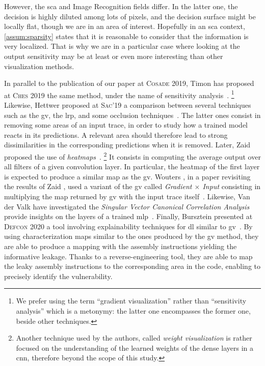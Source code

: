 However, the \gls{sca} and Image Recognition fields differ.
In the latter one, the decision is highly diluted among lots of pixels, and the decision surface might be locally flat, though we are in an area of interest.
Hopefully in an \gls{sca} context, \autoref{assum:sparsity} states that it is reasonable to consider that the information is very localized.  
That is why we are in a particular case where looking at the output sensitivity may be at least or even more interesting than other visualization methods.

In parallel to the publication of our paper at \textsc{Cosade} 2019, Timon has proposed at \textsc{Ches} 2019 the same method, under the name of sensitivity analysis~\cite{timon_non-profiled_2019}.%
\footnote{
	We prefer using the term ``gradient visualization'' rather than ``sensitivity analysis'' which is a metonymy: the latter one encompasses the former one, beside other techniques.
}
Likewise, Hettwer proposed at \textsc{Sac}'19 a comparison between several techniques such as the \gls{gv}, the \gls{lrp}, and some occlusion techniques~\cite{hettwer_deep_2019}.
The latter ones consist in removing some areas of an input trace, in order to study how a trained model reacts in its predictions.
A relevant area should therefore lead to strong dissimilarities in the corresponding predictions when it is removed.
Later, Zaid \etal{} proposed the use of \emph{heatmaps}~\cite{zaid_methodology_2019}.%
\footnote{Another technique used by the authors, called \emph{weight visualization} is rather focused on the understanding of the learned weights of the dense layers in a \gls{cnn}, therefore beyond the scope of this study.}
It consists in computing the average output over all filters of a given convolution layer.
In particular, the heatmap of the first layer is expected to produce a similar map as the \gls{gv}.
Wouters \etal{}, in a paper revisiting the results of Zaid \etal{}, used a variant of the \gls{gv} called \emph{Gradient \(\times\) Input} consisting in multiplying the map returned by \gls{gv} with the input trace itself~\cite{wouters_revisiting_2020}.
Likewise, Van der Valk \etal{} have investigated the \emph{Singular Vector Canonical Correlation Analysis} provide insights on the layers of a trained \gls{mlp}~\cite{vanDerValk_kilroy_2019}.
Finally, Bursztein \etal{} presented at \textsc{Defcon} 2020 a tool involving explainability techniques for \gls{dl} similar to \gls{gv}~\cite{elie_scadl_2020}.
By using characterization maps similar to the ones produced by the \gls{gv} method, they are able to produce a mapping with the assembly instructions yielding the informative leakage.
Thanks to a reverse-engineering tool, they are able to map the leaky assembly instructions to the corresponding area in the code, enabling to precisely identify the vulnerability.